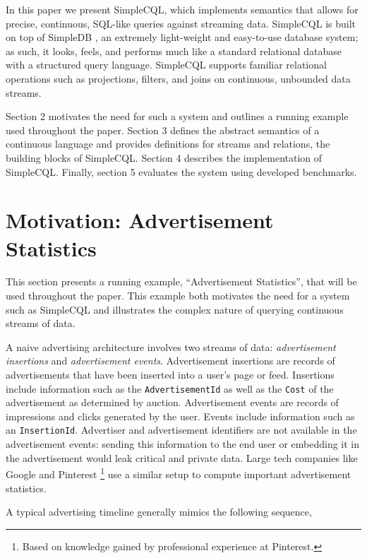 \documentclass[a4paper, 10pt, conference]{IEEEconf}
\begin{document}
In this paper we present SimpleCQL, which implements semantics that allows for precise, continuous, SQL-like queries against streaming data.  SimpleCQL is built on top of SimpleDB \cite{simpledb}, an extremely light-weight and easy-to-use database system; as such, it looks, feels, and performs much like a standard relational database with a structured query language. SimpleCQL supports familiar relational operations such as projections, filters, and joins on continuous, unbounded data streams.

Section 2 motivates the need for such a system and outlines a running example used throughout the paper.  Section 3 defines the abstract semantics of a continuous language and provides definitions for streams and relations, the building blocks of SimpleCQL.  Section 4 describes the implementation of SimpleCQL.  Finally, section 5 evaluates the system using developed benchmarks.


\section{Motivation: Advertisement Statistics}
This section presents a running example, ``Advertisement Statistics'', that will be used throughout the paper.  This example both motivates the need for a system such as SimpleCQL and illustrates the complex nature of querying continuous streams of data.

A naive advertising architecture involves two streams of data: \textit{advertisement insertions} and \textit{advertisement events}. Advertisement insertions are records of advertisements that have been inserted into a user's page or feed.  Insertions include information such as the \texttt{AdvertisementId} as well as the \texttt{Cost} of the advertisement as determined by auction.  Advertisement events are records of impressions and clicks generated by the user.  Events include information such as an \texttt{InsertionId}.  Advertiser and advertisement identifiers are not available in the advertisement events: sending this information to the end user or embedding it in the advertisement would leak critical and private data. Large tech companies like Google \cite{photon} and Pinterest \footnote{Based on knowledge gained by professional experience at Pinterest.} use a similar setup to compute important advertisement statistics. 


A typical advertising timeline generally mimics the following sequence,
\end{document}
